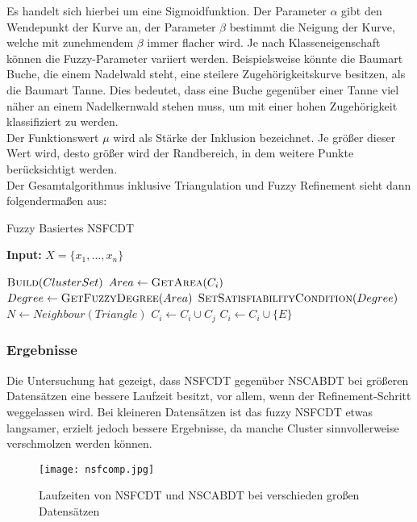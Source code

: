 \documentclass[11pt,ceqn]{book}
\begin{document}
Es handelt sich hierbei um eine Sigmoidfunktion. Der Parameter $\alpha$ gibt den Wendepunkt der Kurve an, der Parameter $\beta$ bestimmt die Neigung der Kurve, welche mit zunehmendem $\beta$ immer flacher wird. Je nach Klasseneigenschaft können die Fuzzy-Parameter variiert werden. Beispielsweise könnte die Baumart Buche, die einem Nadelwald steht, eine steilere Zugehörigkeitskurve besitzen, als die Baumart Tanne. Dies bedeutet, dass eine Buche gegenüber einer Tanne viel näher an einem Nadelkernwald stehen muss, um mit einer hohen Zugehörigkeit klassifiziert zu werden. 
\\
Der Funktionswert $\mu$ wird als Stärke der Inklusion bezeichnet. Je größer dieser Wert wird, desto größer wird der Randbereich, in dem weitere Punkte berücksichtigt werden.\\
Der Gesamtalgorithmus inklusive Triangulation und Fuzzy Refinement sieht dann folgendermaßen aus:

\begin{algorithm}[H]
\caption{Fuzzy Basiertes NSFCDT}\label{nsfcdt}
\hspace*{\algorithmicindent} \textbf{Input:} $X=\{x_1,\dots,x_n\}$ 
\begin{algorithmic}[1]
\State $\textsc{Build} (ClusterSet)$
\State $Area \gets \textsc{Get}\textsc{Area}(C_i)$
\State $Degree \gets \textsc{Get}\textsc{Fuzzy}\textsc{Degree}(Area)$
\State $\textsc{Set}\textsc{Satisfiability}\textsc{Condition}(Degree)$
\State $N \gets Neighbour(Triangle)$
\State $C_i \gets C_i \cup C_j$
\Else 
\State $C_i \gets C_i \cup \{E\}$
\EndIf
\EndIf
\EndFor
\EndFor
\EndFor
\end{algorithmic}
\end{algorithm} 

\subsubsection{Ergebnisse}
Die Untersuchung hat gezeigt, dass NSFCDT gegenüber NSCABDT bei größeren Datensätzen eine bessere Laufzeit besitzt, vor allem, wenn der Refinement-Schritt weggelassen wird. Bei kleineren Datensätzen ist das fuzzy NSFCDT etwas langsamer, erzielt jedoch bessere Ergebnisse, da manche Cluster sinnvollerweise verschmolzen werden können.

\begin{figure}[H]
\centering
\texttt{[image: nsfcomp.jpg]}
\caption{Laufzeiten von NSFCDT und NSCABDT bei verschieden großen Datensätzen}
\end{figure}
\end{document}

